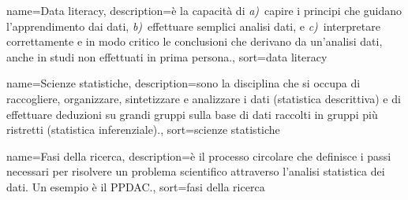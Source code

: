  
{
	 name={Data literacy},
	 description={\`e la capacit\`a di \emph{a)}~capire i principi che guidano l'apprendimento dai dati, \emph{b)}~effettuare semplici analisi dati, e \emph{c)}~interpretare correttamente e in modo critico le conclusioni che derivano da un'analisi dati, anche in studi non effettuati in prima persona.},
	 sort={data literacy}
}

{
	 name={Scienze statistiche},
	 description={sono la disciplina che si occupa di raccogliere, organizzare, sintetizzare e analizzare i dati (statistica descrittiva) e di effettuare deduzioni su grandi gruppi sulla base di dati raccolti in gruppi pi\`u ristretti (statistica inferenziale).},
	 sort={scienze statistiche}
}

{
	 name={Fasi della ricerca},
	 description={\`e il processo circolare che definisce i passi necessari per risolvere un problema scientifico attraverso l'analisi statistica dei dati. Un esempio \`e il \gls{PPDAC}.},
	 sort={fasi della ricerca}
}

